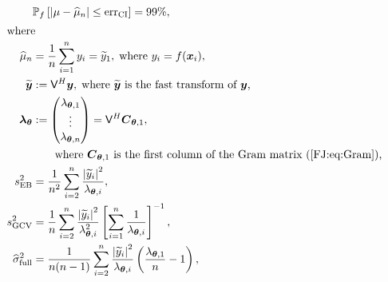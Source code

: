 \documentclass[graybox,footinfo]{svmult}
\newcommand{\abs}[1]{\left\lvert #1 \right\rvert} %
\begin{document}
		\begin{align}
			\label{FJ:eqn:CI}
			&\mathbb{P}_f \left[
			|\mu-\widehat{\mu}_n| \leq \textup{err}_{\textup{CI}}
			\right] = 99\%, \\
			\intertext{where}
			\label{FJ:muhatGCV-FB-MLE-Simple}
			\widehat{\mu}_n &= \frac 1n \sum_{i=1}^n y_i = \widetilde{y}_1, \;  \text{where $y_i =f(\bsx_i)$},\\
		\nonumber 
		\widetilde{\bsy} &:= \mathsf{V}^H \bsy, \; \text{where $\widetilde{\bsy}$ is the fast transform of $\bsy$,}  \\
		\nonumber 
		{\bslambda}_\bstheta &:= \begin{pmatrix}
			\lambda_{\bstheta,1} \\ \vdots \\ \lambda_{\bstheta,n} \end{pmatrix} = \mathsf{V}^H \bsC_{\bstheta,1}, \\ & \nonumber \qquad \text{where $\bsC_{\bstheta,1}$ is the first column of the Gram matrix (\ref{FJ:eq:Gram}),} \\
		\nonumber
		s^2_\textup{EB} 
		& =
		\frac{1}{n^2} 
		\sum_{i=2}^n \frac{\abs{\widetilde{y}_i}^2}{\lambda_{\bstheta,i}},  \\
		\nonumber 
		s^2_{\textup{GCV}} & =  \frac 1{n} \sum_{i=2}^n \frac{\abs{\widetilde{y}_i}^2}{\lambda_{\bstheta,i}^2}  \left [ \sum_{i=1}^n \frac{1}{\lambda_{\bstheta,i}} \right]^{-1}, \\
		\nonumber
		\widehat{\sigma}^2_{\textup{full}} &= \frac{1}{n(n-1)} \sum_{i=2}^n \frac{\abs{\widetilde{y}_i}^2}{\lambda_{\bstheta,i}}  \left(\frac{\lambda_{\bstheta,1}}{n}  - 1  \right), 
		\end{align}
\end{document}
